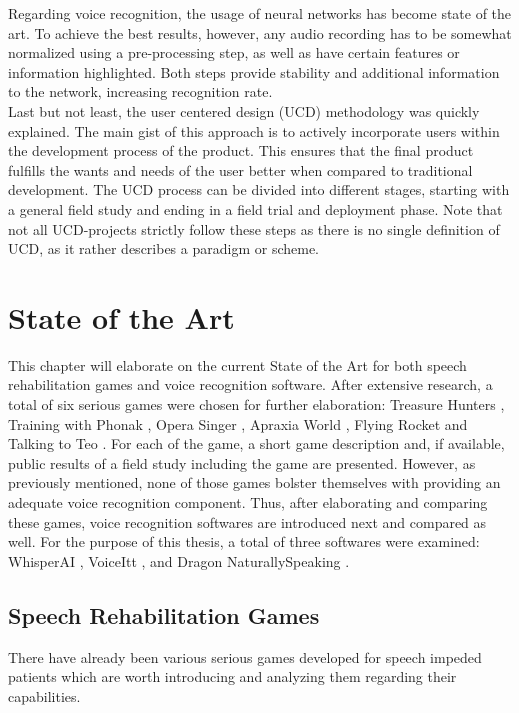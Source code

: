 \documentclass[draft,final]{vutinfth} %
\begin{document}
Regarding voice recognition, the usage of neural networks has become state of the art. To achieve the best results, however, any audio recording has to be somewhat normalized using a pre-processing step, as well as have certain features or information highlighted. Both steps provide stability and additional information to the network, increasing recognition rate. \\
Last but not least, the user centered design (UCD) methodology was quickly explained. The main gist of this approach is to actively incorporate users within the development process of the product. This  ensures that the final product fulfills the wants and needs of the user better when compared to traditional development. The UCD process can be divided into different stages, starting with a general field study and ending in a field trial and deployment phase. Note that not all UCD-projects strictly follow these steps as there is no single definition of UCD, as it rather describes a paradigm or scheme.


\chapter{State of the Art}
\label{chap:state}
This chapter will elaborate on the current State of the Art for both speech rehabilitation games and voice recognition software. After extensive research, a total of six serious games were chosen for further elaboration: Treasure Hunters \cite{TreasureHunters}, Training with Phonak \cite{Phonak}, Opera Singer \cite{ParkinsonGame}, Apraxia World \cite{hair2021longitudinal}, Flying Rocket \cite{takagi2020voice} and Talking to Teo \cite{navarro2014talking}. For each of the game, a short game description and, if available, public results of a field study including the game are presented. However, as previously mentioned, none of those games bolster themselves with providing an adequate voice recognition component. Thus, after elaborating and comparing these games, voice recognition softwares are introduced next and compared as well. For the purpose of this thesis, a total of three softwares were examined: WhisperAI \cite{radford2023robust}, VoiceItt \cite{howarth2024developing}, and Dragon NaturallySpeaking \cite{mccrocklin2020revisiting} .
\section{Speech Rehabilitation Games}
There have already been various serious games developed for speech impeded patients which are worth introducing and analyzing them regarding their capabilities.
\end{document}

